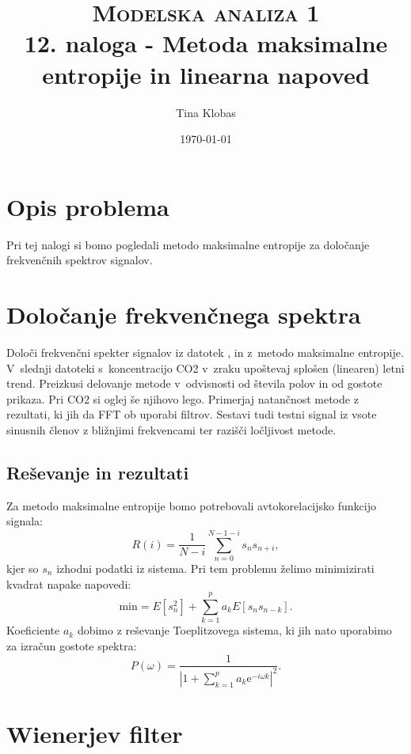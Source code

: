 \documentclass[a4paper,pdftex,10pt]{article}
\title{	
\normalfont \normalsize 
\textsc{Modelska analiza 1} \\ [25pt] %
\huge 12. naloga - Metoda maksimalne entropije in linearna napoved\\ %
}
\author{Tina Klobas} %
\date{\normalsize\today} %
\numberwithin{figure}{section} %
\begin{document}
\maketitle %

\section{Opis problema}
Pri tej nalogi si bomo pogledali metodo maksimalne entropije za določanje frekvenčnih 
spektrov signalov.

\section{Določanje frekvenčnega spektra}
Določi frekvenčni spekter signalov iz datotek ,  in 
 z~metodo maksimalne entropije. V~slednji datoteki s~koncentracijo CO2 
v~zraku upoštevaj splošen (linearen) letni trend. Preizkusi delovanje metode v~odvisnosti 
od števila polov in od gostote prikaza. Pri CO2 si oglej še njihovo lego. Primerjaj 
natančnost metode z rezultati, ki jih da FFT ob uporabi filtrov. Sestavi tudi testni 
signal iz vsote sinusnih členov z bližnjimi frekvencami ter razišči ločljivost metode.

\subsection{Reševanje in rezultati}
Za metodo maksimalne entropije bomo potrebovali avtokorelacijsko funkcijo signala:
\begin{equation}
    R(i) = \frac{1}{N-i} \sum_{n=0}^{N-1-i} s_n s_{n+i},
\end{equation}
kjer so $s_n$ izhodni podatki iz sistema. Pri tem problemu želimo minimizirati kvadrat
napake napovedi:
\begin{equation}
    \text{min} = E[s_n^2] + \sum_{k=1}^p a_k E[s_n s_{n-k} ].
\end{equation}
Koeficiente $a_k$ dobimo z reševanje Toeplitzovega sistema, ki jih nato uporabimo za izračun
gostote spektra:
\begin{equation}
    P(\omega) = \frac{1}{| 1+ \sum_{k=1}^p a_k \mathrm{e}^{-i\omega k}|^2}.
\end{equation}
\pagebreak

\section{Wienerjev filter}
\end{document}
